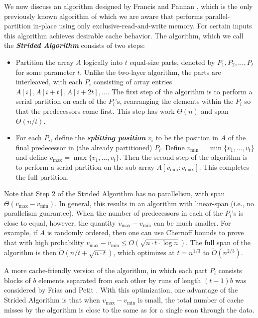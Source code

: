 \documentclass[sigconf]{acmart}
\newcommand{\defn}[1]       {{\textit{\textbf{\boldmath #1}}}}
\renewcommand{\paragraph}[1]{\vspace{0.09in}\noindent{\bf \boldmath #1.}}
\theoremstyle{remark}
\theoremstyle{remark}
\begin{document}
\paragraph{A Cache-Efficient Algorithm}

We now discuss an algorithm designed by Francis and Pannan \cite{FrancisPa92}, which is the only previously known algorithm of which we are aware that performs parallel-partition in-place using only exclusive-read-and-write memory. 
For certain inputs this algorithm achieves desirable cache behavior. 
The algorithm, which we call the \defn{Strided Algorithm} consists of two steps: 
\begin{itemize}
\item Partition the array $A$ logically into $t$ equal-size parts, denoted by
  $P_1, P_2, \ldots, P_t$ for some parameter $t$. Unlike the two-layer
  algorithm, the parts are interleaved, with each $P_i$ consisting of
  array entries $A[i], A[i + t], A[i + 2t], \ldots$. The first step of
  the algorithm is to perform a serial partition on each of the
  $P_i$'s, rearranging the elements within the $P_i$ so that the
  predecessors come first. This step has work $\Theta(n)$ and span
  $\Theta(n/t)$.
\item For each $P_i$, define the \defn{splitting position} $v_i$ to be
  the position in $A$ of the final predecessor in (the already
  partitioned) $P_i$. Define $v_{\text{min}} = \min\{v_1, \ldots,
  v_t\}$ and define $v_{\text{max}} = \max\{v_1, \ldots, v_t\}$. Then the
  second step of the algorithm is to perform a serial partition on the
  sub-array $A[v_{\text{min}} : v_{\text{max}}]$. This completes the
    full partition.
\end{itemize}

Note that Step 2 of the Strided Algorithm has no parallelism, with span $\Theta(v_{\text{max}} - v_{\text{min}})$. 
In general, this results in an algorithm with linear-span (i.e., no parallelism guarantee).
When the number of predecessors in each of the $P_i$'s is close to equal, however, the quantity $v_{\text{max}} - v_{\text{min}}$ can be much smaller. 
For example, if $A$ is randomly ordered, then one can use Chernoff bounds to prove that with high probability $v_{\text{max}} - v_{\text{min}} \le O(\sqrt{n \cdot t
  \cdot \log n})$. 
The full span of the algorithm is then $\tilde{O}(n/t + \sqrt{n \cdot t})$, which optimizes at $t = n^{1/3}$ to $\tilde{O}(n^{2/3})$.

A more cache-friendly version of the algorithm, in which each part $P_i$ consists blocks of $b$ elements separated from each other by runs of length $(t - 1) b$ was considered by Frias and Petit \cite{Frias08}. 
With this optimization, one advantage of the Strided Algorithm is that when $v_{\text{max}} - v_{\text{min}}$ is small, the total number of cache misses by the algorithm is close to the same as for a single scan through the data. 
\end{document}
